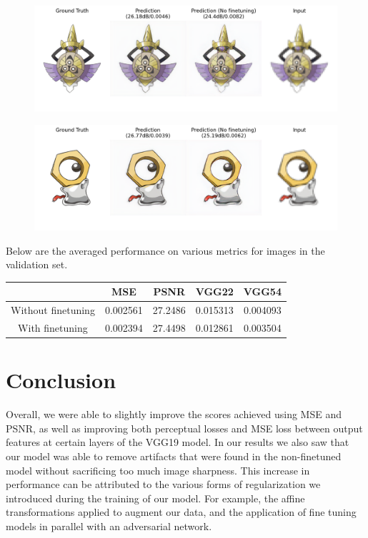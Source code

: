 \documentclass[11pt,titlepage]{article}
\begin{document}
\begin{figure}[H]
    \centering
    \includegraphics[width=\textwidth]{results/681_f2.png}
\end{figure}
\begin{figure}[H]
    \centering
    \includegraphics[width=\textwidth]{results/808.png}
\end{figure}

Below are the averaged performance on various metrics for images in the validation set. 
\begin{center}
\begin{tabular}{|c|c|c|c|c|}
     \hline
     & MSE & PSNR & VGG22 & VGG54\\
     \hline
     Without finetuning & 0.002561 & 27.2486 & 0.015313 & 0.004093\\
     With finetuning & 0.002394 & 27.4498 & 0.012861 & 0.003504\\
     \hline
\end{tabular}
\end{center}

\section*{Conclusion}

Overall, we were able to slightly improve the scores achieved using MSE and PSNR, as well as improving both perceptual losses and MSE loss between output features at certain layers of the VGG19 model. In our results we also saw that our model was able to remove artifacts that were found in the non-finetuned model without sacrificing too much image sharpness. This increase in performance can be attributed to the various forms of regularization we introduced during the training of our model. For example, the affine transformations applied to augment our data, and the application of fine tuning models in parallel with an adversarial network.\\
\end{document}
